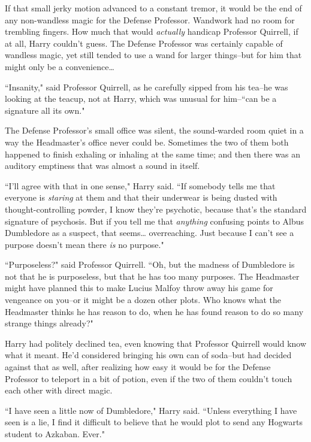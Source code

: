 If that small jerky motion advanced to a constant tremor, it would be the end of any non-wandless magic for the Defense Professor. Wandwork had no room for trembling fingers. How much that would \emph{actually} handicap Professor Quirrell, if at all, Harry couldn't guess. The Defense Professor was certainly capable of wandless magic, yet still tended to use a wand for larger things\---but for him that might only be a convenience{\ldots}

``Insanity," said Professor Quirrell, as he carefully sipped from his tea\---he was looking at the teacup, not at Harry, which was unusual for him\---``can be a signature all its own."

The Defense Professor's small office was silent, the sound-warded room quiet in a way the Headmaster's office never could be. Sometimes the two of them both happened to finish exhaling or inhaling at the same time; and then there was an auditory emptiness that was almost a sound in itself.

``I'll agree with that in one sense," Harry said. ``If somebody tells me that everyone is \emph{staring} at them and that their underwear is being dusted with thought-controlling powder, I know they're psychotic, because that's the standard signature of psychosis. But if you tell me that \emph{anything} confusing points to Albus Dumbledore as a suspect, that seems{\ldots} overreaching. Just because I can't see a purpose doesn't mean there \emph{is} no purpose."

``Purposeless?" said Professor Quirrell. ``Oh, but the madness of Dumbledore is not that he is purposeless, but that he has too many purposes. The Headmaster might have planned this to make Lucius Malfoy throw away his game for vengeance on you\---or it might be a dozen other plots. Who knows what the Headmaster thinks he has reason to do, when he has found reason to do so many strange things already?"

Harry had politely declined tea, even knowing that Professor Quirrell would know what it meant. He'd considered bringing his own can of soda\---but had decided against that as well, after realizing how easy it would be for the Defense Professor to teleport in a bit of potion, even if the two of them couldn't touch each other with direct magic.

``I have seen a little now of Dumbledore," Harry said. ``Unless everything I have seen is a lie, I find it difficult to believe that he would plot to send any Hogwarts student to Azkaban. Ever."

